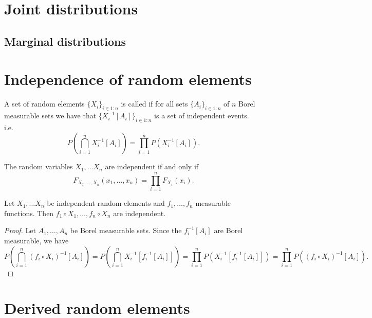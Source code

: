 \section{Joint distributions}
\subsection{Marginal distributions}

\section{Independence of random elements}
\begin{definition}
A set of random elements $\{X_i\}_{i\in 1:n}$ is called  if for all sets $\{A_i\}_{i\in 1:n}$ of $n$ Borel measurable sets we have that $\{X_i^{-1}[A_i]\}_{i\in 1:n}$ is a set of independent events. i.e.\
\[ P\left(\bigcap_{i=1}^n X_i^{-1}[A_i]\right) = \prod_{i=1}^n P(X_i^{-1}[A_i]). \]
\end{definition}

\begin{proposition}
The random variables $X_1, \ldots X_n$ are independent \textup{if and only if}
\[ F_{X_1,\ldots, X_n}(x_1, \ldots, x_n) = \prod_{i=1}^n F_{X_i}(x_i). \]
\end{proposition}

\begin{proposition}
Let $X_1, \ldots X_n$ be independent random elements and $f_1, \ldots, f_n$ measurable functions. Then $f_1\circ X_1, \ldots, f_n\circ X_n$ are independent.
\end{proposition}
\begin{proof}
Let $A_1, \ldots, A_n$ be Borel measurable sets. Since the $f_i^{-1}[A_i]$ are Borel measurable, we have
\[ P\left(\bigcap_{i=1}^n (f_i\circ X_i)^{-1}[A_i]\right) = P\left(\bigcap_{i=1}^n X_i^{-1}[f^{-1}_i[A_i]]\right) = \prod_{i=1}^n P(X_i^{-1}[f^{-1}_i[A_i]]) = \prod_{i=1}^n P((f_i\circ X_i)^{-1}[A_i]). \]
\end{proof}

\section{Derived random elements}

